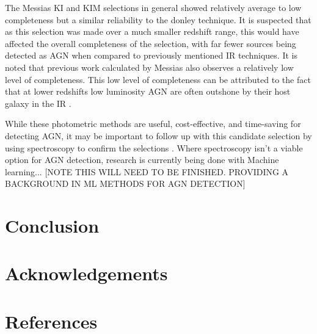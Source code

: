 \documentclass[11pt]{iopart}
\begin{document}
The Messias KI and KIM selections in general showed relatively average to low completeness but a similar reliability to the donley technique. It is suspected that as this selection was made over a much smaller redshift range, this would have affected the overall completeness of the selection, with far fewer sources being detected as AGN when compared to previously mentioned IR techniques. It is noted that previous work calculated by Messias \cite{messias_new_2012, messias_dependency_2014} also observes a relatively low level of completeness. This low level of completeness can be attributed to the fact that at lower redshifts low luminosity AGN are often outshone by their host galaxy in the IR \cite{messias_dependency_2014}. 


While these photometric methods are useful, cost-effective, and time-saving for detecting AGN, it may be important to follow up with this candidate selection by using spectroscopy to confirm the selections \cite{hainline_spectroscopic_2014}. Where spectroscopy isn't a viable option for AGN detection, research is currently being done with Machine learning... [NOTE THIS WILL NEED TO BE FINISHED. PROVIDING A BACKGROUND IN ML METHODS FOR AGN DETECTION]

\newpage
\section{Conclusion}
\newpage
\section*{Acknowledgements}
\newpage
\section*{References}



\end{document}
